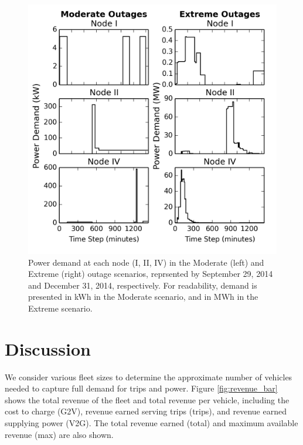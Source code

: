 \documentclass[journal]{IEEEtran}
\begin{document}
\begin{figure}[!htbp]
  \includegraphics[width=\linewidth]{plots/power_demand.png}
  \caption{Power demand at each node (I, II, IV) in the Moderate (left) and Extreme (right) outage scenarios, reprsented by September 29, 2014 and December 31, 2014, respectively. For readability, demand is presented in kWh in the Moderate scenario, and in MWh in the Extreme scenario.}
  \label{fig:power_demand}
\end{figure}

\section{Discussion}
We consider various fleet sizes to determine the approximate number of vehicles needed to capture full demand for trips and power. Figure \ref{fig:revenue_bar} shows the total revenue of the fleet and total revenue per vehicle, including the cost to charge (G2V), revenue earned serving trips (trips), and revenue earned supplying power (V2G). The total revenue earned (total) and maximum available revenue (max) are also shown.
\end{document}
